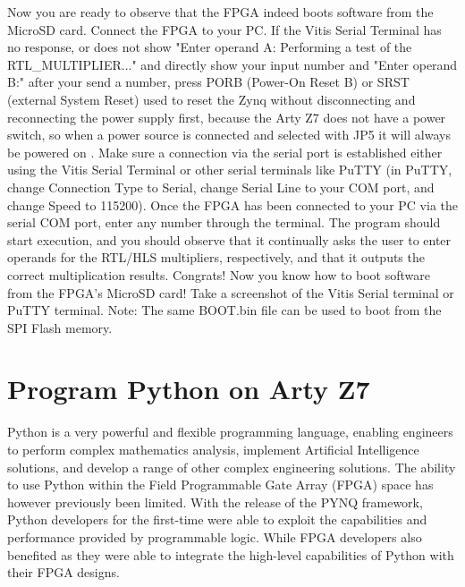 \documentclass[a4paper,12pt,twoside]{article}
\begin{document}
Now you are ready to observe that the FPGA indeed boots software from the MicroSD card. Connect the FPGA to your PC. If the Vitis Serial Terminal has no response, or does not show "Enter operand A: Performing a test of the RTL\_MULTIPLIER..." and directly show your input number and "Enter operand B:" after your send a number, press PORB (Power-On Reset B) or SRST (external System Reset) used to reset the Zynq without disconnecting and reconnecting the power supply first, because the Arty Z7 does not have a power switch, so when a power source is connected and selected with JP5 it will always be powered on \cite{porb} \cite{porbvssrst} \cite{srst} \cite{ug585}. Make sure a connection via the serial port is established either using the Vitis Serial Terminal or other serial terminals like PuTTY (in PuTTY, change Connection Type to Serial, change Serial Line to your COM port, and change Speed to 115200). Once the FPGA has been connected to your PC via the serial COM port, enter any number through the terminal. The program should start execution, and you should observe that it continually asks the user to enter operands for the RTL/HLS multipliers, respectively, and that it outputs the correct multiplication results. Congrats! Now you know how to boot software from the FPGA’s MicroSD card! Take a screenshot of the Vitis Serial terminal or PuTTY terminal. Note: The same BOOT.bin file can be used to boot from the SPI Flash memory.

\section{Program Python on Arty Z7}\label{S4}
Python is a very powerful and flexible programming language, enabling engineers to perform complex mathematics analysis, implement Artificial Intelligence solutions, and develop a range of other complex engineering solutions. The ability to use Python within the Field Programmable Gate Array (FPGA) space has however previously been limited. With the release of the PYNQ framework, Python developers for the first-time were able to exploit the capabilities and performance provided by programmable logic. While FPGA developers also benefited as they were able to integrate the high-level capabilities of Python with their FPGA designs.
\end{document}
